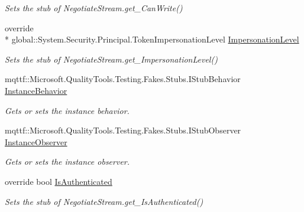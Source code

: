 \begin{DoxyCompactItemize}
\begin{DoxyCompactList}\small\item\em Sets the stub of Negotiate\-Stream.\-get\-\_\-\-Can\-Write()\end{DoxyCompactList}\item 
override \\*
global\-::\-System.\-Security.\-Principal.\-Token\-Impersonation\-Level \hyperlink{class_system_1_1_net_1_1_security_1_1_fakes_1_1_stub_negotiate_stream_a847228f4de1ef25435f3d5529943179a}{Impersonation\-Level}
\begin{DoxyCompactList}\small\item\em Sets the stub of Negotiate\-Stream.\-get\-\_\-\-Impersonation\-Level()\end{DoxyCompactList}\item 
mqttf\-::\-Microsoft.\-Quality\-Tools.\-Testing.\-Fakes.\-Stubs.\-I\-Stub\-Behavior \hyperlink{class_system_1_1_net_1_1_security_1_1_fakes_1_1_stub_negotiate_stream_a8124169f92fd46e4f4a81d8c0d291bde}{Instance\-Behavior}
\begin{DoxyCompactList}\small\item\em Gets or sets the instance behavior.\end{DoxyCompactList}\item 
mqttf\-::\-Microsoft.\-Quality\-Tools.\-Testing.\-Fakes.\-Stubs.\-I\-Stub\-Observer \hyperlink{class_system_1_1_net_1_1_security_1_1_fakes_1_1_stub_negotiate_stream_a675ce51596633a4e33e9385e30dc3fa7}{Instance\-Observer}
\begin{DoxyCompactList}\small\item\em Gets or sets the instance observer.\end{DoxyCompactList}\item 
override bool \hyperlink{class_system_1_1_net_1_1_security_1_1_fakes_1_1_stub_negotiate_stream_aaacad686066c7af1bcab14f077df0ffd}{Is\-Authenticated}
\begin{DoxyCompactList}\small\item\em Sets the stub of Negotiate\-Stream.\-get\-\_\-\-Is\-Authenticated()\end{DoxyCompactList}\item 

\end{DoxyCompactItemize}
